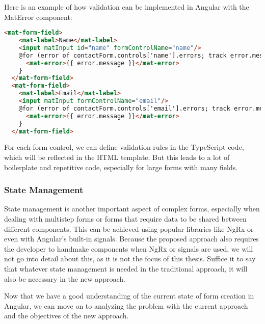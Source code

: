 Here is an example of how validation can be implemented in Angular with the MatError component:

\begin{lstlisting}[language=HTML,caption={Errors in HTML}, label={lst:errorsHTML}]
  <mat-form-field>
    <mat-label>Name</mat-label>
    <input matInput id="name" formControlName="name"/>
    @for (error of contactForm.controls['name'].errors; track error.message) {
      <mat-error>{{ error.message }}</mat-error>
    }
  </mat-form-field>
  <mat-form-field>
    <mat-label>Email</mat-label>
    <input matInput formControlName="email"/>
    @for (error of contactForm.controls['email'].errors; track error.message) {
      <mat-error>{{ error.message }}</mat-error>
    }
  </mat-form-field>
\end{lstlisting}

For each form control, we can define validation rules in the TypeScript code, which will be reflected in the HTML template.
But this leads to a lot of boilerplate and repetitive code, especially for large forms with many fields.

\subsubsection{State Management}

State management is another important aspect of complex forms, especially when dealing with multistep forms or forms
that require data to be shared between different components.
This can be achieved using popular libraries like NgRx or even with Angular's built-in signals.
Because the proposed approach also requires the developer to handmake components when NgRx or signals are used,
we will not go into detail about this, as it is not the focus of this thesis.
Suffice it to say that whatever state management is needed in the traditional approach, it will also be necessary in the
new approach.

Now that we have a good understanding of the current state of form creation in Angular, we can move on to analyzing the
problem with the current approach and the objectives of the new approach.